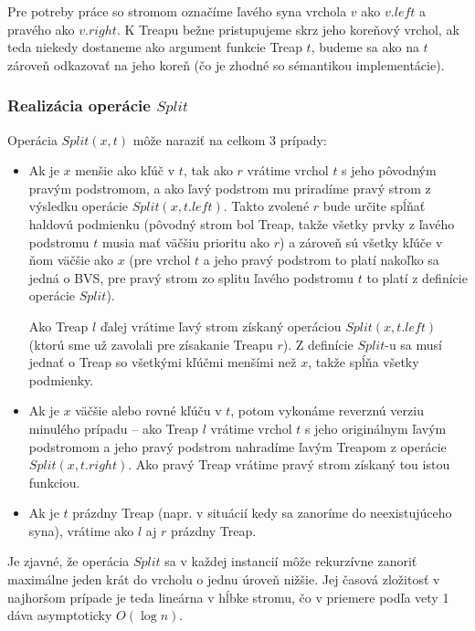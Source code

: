 \documentclass[a4paper, 12pt]{article}
\theoremstyle{definition}
\begin{document}
Pre potreby práce so stromom označíme ľavého syna vrchola $v$ ako $v.left$ a
pravého ako $v.right$. K Treapu bežne pristupujeme skrz jeho koreňový vrchol,
ak teda niekedy dostaneme ako argument funkcie Treap $t$, budeme sa ako na $t$
zároveň odkazovať na jeho koreň (čo je zhodné so sémantikou implementácie).

\subsubsection{Realizácia operácie $Split$}

Operácia $Split(x, t)$ môže naraziť na celkom 3 prípady:
\begin{itemize}
    \item Ak je $x$ menšie ako kľúč v $t$, tak ako $r$ vrátime vrchol $t$ s
        jeho pôvodným pravým podstromom, a ako ľavý podstrom mu priradíme pravý
        strom z výsledku operácie $Split(x, t.left)$. Takto zvolené $r$ bude
        určite spĺňať haldovú podmienku (pôvodný strom bol Treap, takže všetky
        prvky z ľavého podstromu $t$ musia mať väčšiu prioritu ako $r$) a
        zároveň sú všetky kľúče v ňom väčšie ako $x$ (pre vrchol $t$ a jeho
        pravý podstrom to platí nakoľko sa jedná o BVS, pre pravý strom zo
        splitu ľavého podstromu $t$ to platí z definície operácie $Split$).

        Ako Treap $l$ ďalej vrátime ľavý strom získaný
        operáciou $Split(x, t.left)$ (ktorú sme už zavolali pre zísakanie
        Treapu $r$). Z definície $Split$-u sa musí jednať o Treap so všetkými
        kľúčmi menšími než $x$, takže spĺňa všetky podmienky.

    \item Ak je $x$ väčšie alebo rovné kľúču v $t$, potom vykonáme reverznú
        verziu minulého prípadu -- ako Treap $l$ vrátime vrchol $t$ s jeho
        originálnym ľavým podstromom a jeho pravý podstrom nahradíme ľavým
        Treapom z operácie $Split(x, t.right)$. Ako pravý Treap vrátime pravý
        strom získaný tou istou funkciou.

    \item Ak je $t$ prázdny Treap (napr. v situácií kedy sa zanoríme do
        neexistujúceho syna), vrátime ako $l$ aj $r$ prázdny Treap.
\end{itemize}

Je zjavné, že operácia $Split$ sa v každej instancií môže rekurzívne zanoriť
maximálne jeden krát do vrcholu o jednu úroveň nižšie. Jej časová zložitosť v
najhoršom prípade je teda lineárna v hĺbke stromu, čo v priemere podľa vety 1
dáva asymptoticky $O(\log n)$.
\end{document}

